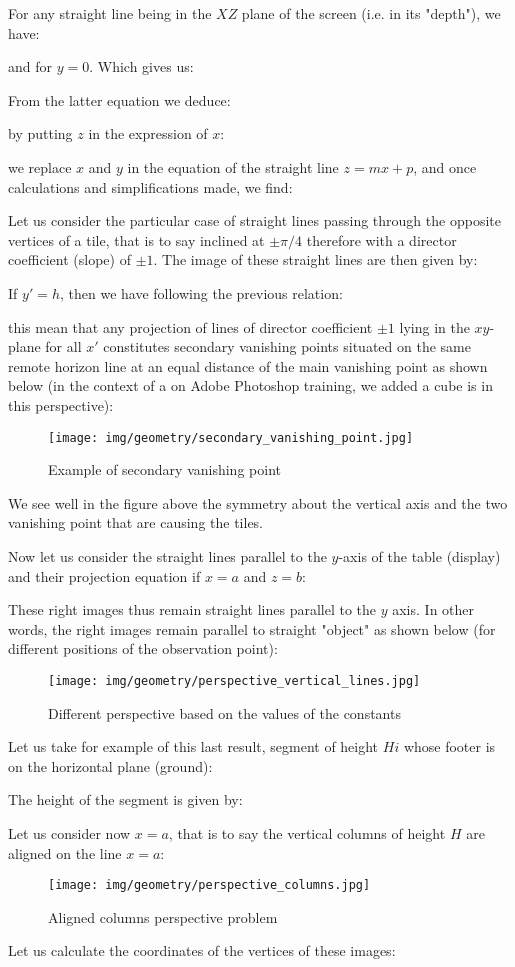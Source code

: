 	For any straight line being in the $XZ$ plane of the screen (i.e. in its "depth"), we have:
	
	and for $y=0$. Which gives us:
	
	From the latter equation we deduce:
	
	by putting $z$ in the expression of $x$:
	
	we replace $x$ and $y$ in the equation of the straight line $z=mx+p$, and once calculations and simplifications made, we find:
	
	Let us consider the particular case of straight lines passing through the opposite vertices of a tile, that is to say inclined at $\pm\pi/4$ therefore with a director coefficient (slope) of $\pm 1$.
	The image of these straight lines are then given by:
	
	If $y'=h$, then we have following the previous relation:
	
	this mean that any projection of lines of director coefficient $\pm 1$ lying in the $xy$-plane for all $x'$ constitutes secondary vanishing points situated on the same remote horizon line at an equal distance of the main vanishing point as shown below (in the context of a on Adobe Photoshop training, we added a cube is in this perspective):
	\begin{figure}[H]
		\centering
		\texttt{[image: img/geometry/secondary\_vanishing\_point.jpg]}
		\caption{Example of secondary vanishing point}
	\end{figure}
	We see well in the figure above the symmetry about the vertical axis and the two vanishing point that are causing the tiles.

	Now let us consider the straight lines parallel to the $y$-axis of the table (display) and their projection equation if $x=a$ and $z=b$:
	
	These right images thus remain straight lines parallel to the $y$ axis. In other words, the right images remain parallel to straight "object" as shown below (for different positions of the observation point):
	\begin{figure}[H]
		\centering
		\texttt{[image: img/geometry/perspective\_vertical\_lines.jpg]}
		\caption{Different perspective based on the values of the constants}
	\end{figure}
	Let us take for example of this last result, segment of height $Hi$ whose footer is on the horizontal plane (ground):
	
	The height of the segment is given by:
	
	Let us consider now $x=a$, that is to say the vertical columns of height $H$ are aligned on the line $x=a$:
	\begin{figure}[H]
		\centering
		\texttt{[image: img/geometry/perspective\_columns.jpg]}
		\caption{Aligned columns perspective problem}
	\end{figure}
	Let us calculate the coordinates of the vertices of these images:
	
